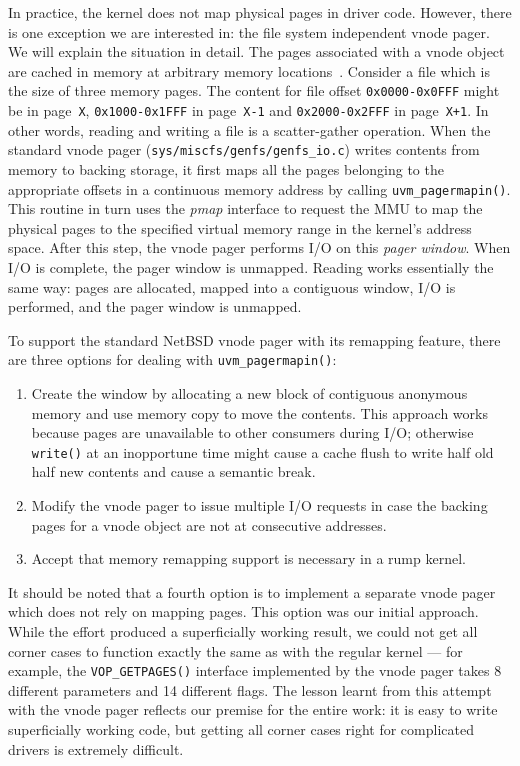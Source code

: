 In practice, the kernel does not map physical pages in driver code.
However, there is one exception we are interested in: the file
system independent vnode pager.  We will explain the situation in
detail.  The pages associated with a vnode object are cached in
memory at arbitrary memory locations~\cite{silvers:ubc}.  Consider
a file which is the size of three memory pages.  The content for
file offset \texttt{0x0000-0x0FFF} might be in page~\texttt{X},
\texttt{0x1000-0x1FFF} in page~\texttt{X-1} and
\texttt{0x2000-0x2FFF} in page~\texttt{X+1}.  In other words,
reading and writing a file is a scatter-gather operation.
When the standard vnode pager
(\verb+sys/miscfs/genfs/genfs_io.c+) writes contents from memory
to backing storage, it first maps all the pages belonging to the
appropriate offsets in a continuous memory address by calling
\verb+uvm_pagermapin()+.  This routine in turn uses the \textit{pmap}
interface to request the MMU to map the physical pages to the
specified virtual memory range in the kernel's address space.
After this step, the vnode pager performs I/O on this
\textit{pager window}.  When I/O is complete, the pager
window is unmapped.  Reading works essentially the same way:  pages
are allocated, mapped into a contiguous window, I/O is performed,
and the pager window is unmapped.

To support the standard NetBSD vnode pager with its remapping
feature, there are three options for dealing with \verb+uvm_pagermapin()+:

\begin{enumerate}
\item   Create the window by allocating a new block of contiguous
	anonymous memory and use memory copy to move the contents.
	This approach works because pages are unavailable to other consumers
	during I/O; otherwise \eg \texttt{write()} at an inopportune
	time might cause a cache flush to write half old half new
	contents and cause a semantic break.

\item   Modify the vnode pager to issue multiple I/O requests in
	case the backing pages for a vnode object are not at
	consecutive addresses.

\item   Accept that memory remapping support is necessary in a rump
	kernel.
\end{enumerate}

It should be noted that a fourth option is to implement a separate
vnode pager which does not rely on mapping pages.  This option was our
initial approach.  While the effort produced a superficially working
result, we could not get all corner cases to function exactly the
same as with the regular kernel --- for example, the \verb+VOP_GETPAGES()+
interface implemented by the vnode pager takes 8 different parameters
and 14 different flags.  The lesson learnt from this attempt with
the vnode pager reflects our premise for the entire work: it is
easy to write superficially working code, but getting all corner
cases right for complicated drivers is extremely difficult.

